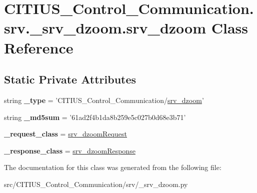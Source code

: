 \hypertarget{class_c_i_t_i_u_s___control___communication_1_1srv_1_1__srv__dzoom_1_1srv__dzoom}{\section{\-C\-I\-T\-I\-U\-S\-\_\-\-Control\-\_\-\-Communication.\-srv.\-\_\-srv\-\_\-dzoom.\-srv\-\_\-dzoom \-Class \-Reference}
\label{class_c_i_t_i_u_s___control___communication_1_1srv_1_1__srv__dzoom_1_1srv__dzoom}
}
\subsection*{\-Static \-Private \-Attributes}
\begin{DoxyCompactItemize}
\item 
\hypertarget{class_c_i_t_i_u_s___control___communication_1_1srv_1_1__srv__dzoom_1_1srv__dzoom_afa06d0ec15557395ab66c2b63cb6a96c}{string {\bfseries \-\_\-type} = '\-C\-I\-T\-I\-U\-S\-\_\-\-Control\-\_\-\-Communication/\hyperlink{class_c_i_t_i_u_s___control___communication_1_1srv_1_1__srv__dzoom_1_1srv__dzoom}{srv\-\_\-dzoom}'}\label{class_c_i_t_i_u_s___control___communication_1_1srv_1_1__srv__dzoom_1_1srv__dzoom_afa06d0ec15557395ab66c2b63cb6a96c}

\item 
\hypertarget{class_c_i_t_i_u_s___control___communication_1_1srv_1_1__srv__dzoom_1_1srv__dzoom_ac344685a3dd6e11ffc31d13bbc104b70}{string {\bfseries \-\_\-md5sum} = '61ad2f4b1da8b259e5c027b0d68e3b71'}\label{class_c_i_t_i_u_s___control___communication_1_1srv_1_1__srv__dzoom_1_1srv__dzoom_ac344685a3dd6e11ffc31d13bbc104b70}

\item 
\hypertarget{class_c_i_t_i_u_s___control___communication_1_1srv_1_1__srv__dzoom_1_1srv__dzoom_a985b63d58f78b2ae7ee4c6139bcd053f}{{\bfseries \-\_\-request\-\_\-class} = \hyperlink{class_c_i_t_i_u_s___control___communication_1_1srv_1_1__srv__dzoom_1_1srv__dzoom_request}{srv\-\_\-dzoom\-Request}}\label{class_c_i_t_i_u_s___control___communication_1_1srv_1_1__srv__dzoom_1_1srv__dzoom_a985b63d58f78b2ae7ee4c6139bcd053f}

\item 
\hypertarget{class_c_i_t_i_u_s___control___communication_1_1srv_1_1__srv__dzoom_1_1srv__dzoom_a1d91e0d835b81ded781eb5b7aff282a5}{{\bfseries \-\_\-response\-\_\-class} = \hyperlink{class_c_i_t_i_u_s___control___communication_1_1srv_1_1__srv__dzoom_1_1srv__dzoom_response}{srv\-\_\-dzoom\-Response}}\label{class_c_i_t_i_u_s___control___communication_1_1srv_1_1__srv__dzoom_1_1srv__dzoom_a1d91e0d835b81ded781eb5b7aff282a5}

\end{DoxyCompactItemize}


\-The documentation for this class was generated from the following file\-:\begin{DoxyCompactItemize}
\item 
src/\-C\-I\-T\-I\-U\-S\-\_\-\-Control\-\_\-\-Communication/srv/\-\_\-srv\-\_\-dzoom.\-py\end{DoxyCompactItemize}

